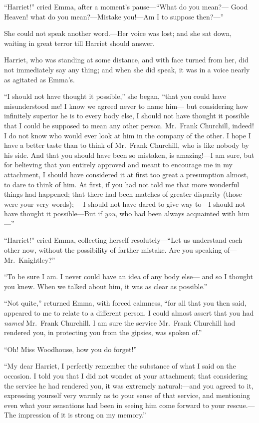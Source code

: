 ``Harriet!'' cried Emma, after a moment's pause---``What do you mean?---%
Good Heaven! what do you mean?---Mistake you!---Am I to suppose then?---''

She could not speak another word.---Her voice was lost; and she
sat down, waiting in great terror till Harriet should answer.

Harriet, who was standing at some distance, and with face turned
from her, did not immediately say any thing; and when she did speak,
it was in a voice nearly as agitated as Emma's.

``I should not have thought it possible,'' she began, ``that you
could have misunderstood me!  I know we agreed never to name him---%
but considering how infinitely superior he is to every body else,
I should not have thought it possible that I could be supposed
to mean any other person.  Mr.\ Frank Churchill, indeed!  I do not
know who would ever look at him in the company of the other.
I hope I have a better taste than to think of Mr.\ Frank Churchill,
who is like nobody by his side.  And that you should have been
so mistaken, is amazing!---I am sure, but for believing that you
entirely approved and meant to encourage me in my attachment,
I should have considered it at first too great a presumption almost,
to dare to think of him.  At first, if you had not told me
that more wonderful things had happened; that there had been
matches of greater disparity (those were your very words);---%
I should not have dared to give way to---I should not have thought
it possible---But if \emph{you}, who had been always acquainted with him---''

``Harriet!'' cried Emma, collecting herself resolutely---``Let us
understand each other now, without the possibility of farther mistake.
Are you speaking of---Mr.\ Knightley?''

``To be sure I am.  I never could have an idea of any body else---%
and so I thought you knew.  When we talked about him, it was as clear
as possible.''

``Not quite,'' returned Emma, with forced calmness, ``for all that
you then said, appeared to me to relate to a different person.
I could almost assert that you had \emph{named} Mr.\ Frank Churchill.
I am sure the service Mr.\ Frank Churchill had rendered you,
in protecting you from the gipsies, was spoken of.''

``Oh!  Miss Woodhouse, how you do forget!''

``My dear Harriet, I perfectly remember the substance of what I
said on the occasion.  I told you that I did not wonder at
your attachment; that considering the service he had rendered you,
it was extremely natural:---and you agreed to it, expressing yourself
very warmly as to your sense of that service, and mentioning
even what your sensations had been in seeing him come forward
to your rescue.---The impression of it is strong on my memory.''

